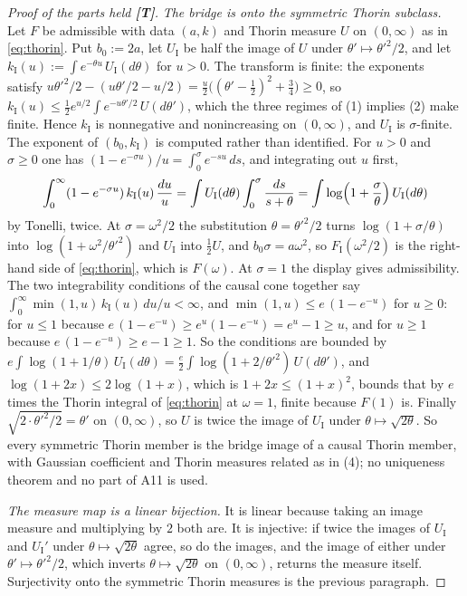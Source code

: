 \begin{proof}[Proof of the parts held \textbf{[T]}]
\emph{The bridge is onto the symmetric Thorin subclass.} Let $F$ be admissible with data $(a,k)$
and Thorin measure $U$ on $(0,\infty)$ as in \ref{eq:thorin}. Put $b_0 := 2a$, let
$U_{\mathrm I}$ be half the image of $U$ under $\theta' \mapsto \theta'^2/2$, and let
$k_{\mathrm I}(u) := \int e^{-\theta u}\,U_{\mathrm I}(d\theta)$ for $u > 0$. The transform is
finite: the exponents satisfy
$u\theta'^2/2 - (u\theta'/2 - u/2) = \tfrac u2\bigl((\theta' - \tfrac12)^2 + \tfrac34\bigr) \ge 0$,
so $k_{\mathrm I}(u) \le \tfrac12 e^{u/2}\int e^{-u\theta'/2}\,U(d\theta')$, which the three
regimes of (1) implies (2) make finite. Hence $k_{\mathrm I}$ is nonnegative and nonincreasing on
$(0,\infty)$, and $U_{\mathrm I}$ is $\sigma$-finite. The exponent of $(b_0, k_{\mathrm I})$ is
computed rather than identified. For $u > 0$ and $\sigma \ge 0$ one has
$(1 - e^{-\sigma u})/u = \int_0^\sigma e^{-su}\,ds$, and integrating out $u$ first,
\[
  \int_0^\infty (1 - e^{-\sigma u})\,k_{\mathrm I}(u)\,\frac{du}{u}
  = \int U_{\mathrm I}(d\theta)\int_0^\sigma \frac{ds}{s + \theta}
  = \int \log\Bigl(1 + \frac{\sigma}{\theta}\Bigr)\,U_{\mathrm I}(d\theta)
\]
by Tonelli, twice. At $\sigma = \omega^2/2$ the substitution $\theta = \theta'^2/2$ turns
$\log(1 + \sigma/\theta)$ into $\log(1 + \omega^2/\theta'^2)$ and $U_{\mathrm I}$ into
$\tfrac12 U$, and $b_0\sigma = a\omega^2$, so $F_{\mathrm I}(\omega^2/2)$ is the right-hand side
of \ref{eq:thorin}, which is $F(\omega)$. At $\sigma = 1$ the display gives admissibility. The two
integrability conditions of the causal cone together say
$\int_0^\infty \min(1,u)\,k_{\mathrm I}(u)\,du/u < \infty$, and $\min(1,u) \le e\,(1 - e^{-u})$
for $u \ge 0$: for $u \le 1$ because $e\,(1 - e^{-u}) \ge e^u(1 - e^{-u}) = e^u - 1 \ge u$, and
for $u \ge 1$ because $e\,(1 - e^{-u}) \ge e - 1 \ge 1$. So the conditions are bounded by
$e\int \log(1 + 1/\theta)\,U_{\mathrm I}(d\theta)
= \tfrac e2\int \log(1 + 2/\theta'^2)\,U(d\theta')$, and $\log(1 + 2x) \le 2\log(1 + x)$, which
is $1 + 2x \le (1 + x)^2$, bounds that by $e$ times the Thorin integral of \ref{eq:thorin} at
$\omega = 1$, finite because $F(1)$ is. Finally $\sqrt{2\cdot\theta'^2/2} = \theta'$ on
$(0,\infty)$, so $U$ is twice the image of $U_{\mathrm I}$ under $\theta \mapsto \sqrt{2\theta}$.
So every symmetric Thorin member is the bridge image of a causal Thorin member, with Gaussian
coefficient and Thorin measures related as in (4); no uniqueness theorem and no part of A11 is
used.

\emph{The measure map is a linear bijection.} It is linear because taking an image measure and
multiplying by $2$ both are. It is injective: if twice the images of $U_{\mathrm I}$ and
$U_{\mathrm I}'$ under $\theta \mapsto \sqrt{2\theta}$ agree, so do the images, and the image of
either under $\theta' \mapsto \theta'^2/2$, which inverts $\theta \mapsto \sqrt{2\theta}$ on
$(0,\infty)$, returns the measure itself. Surjectivity onto the symmetric Thorin measures is the
previous paragraph.


\end{proof}
